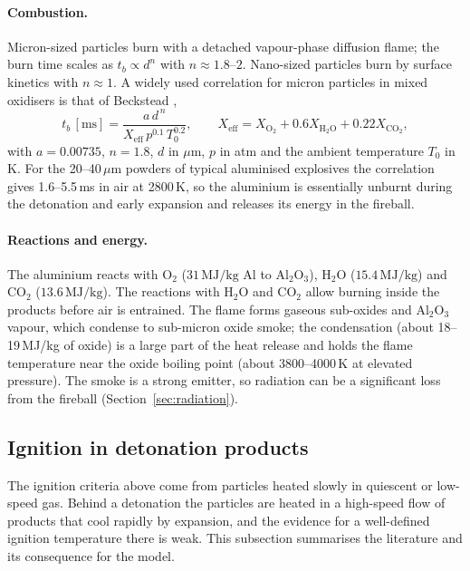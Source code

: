 \documentclass{article}
\begin{document}
\paragraph{Combustion.} Micron-sized particles burn with a detached vapour-phase diffusion flame; the burn time scales as $t_b \propto d^n$ with $n \approx 1.8$--$2$. Nano-sized particles burn by surface kinetics with $n \approx 1$. A widely used correlation for micron particles in mixed oxidisers is that of Beckstead \cite{beckstead},
\begin{equation}
    t_b\,[\text{ms}] = \frac{a\,d^{\,n}}{X_\text{eff}\,p^{0.1}\,T_0^{0.2}}, \qquad X_\text{eff} = X_{\text{O}_2} + 0.6X_{\text{H}_2\text{O}} + 0.22X_{\text{CO}_2},
    \label{eq:beckstead}
\end{equation}
with $a = 0.00735$, $n = 1.8$, $d$ in $\mu$m, $p$ in atm and the ambient temperature $T_0$ in K.
For the 20--40\,$\mu$m powders of typical aluminised explosives the correlation gives 1.6--5.5\,ms in air at 2800\,K, so the aluminium is essentially unburnt during the detonation and early expansion and releases its energy in the fireball.

\paragraph{Reactions and energy.} The aluminium reacts with O$_2$ ($31\,\text{MJ/kg}$ Al to Al$_2$O$_3$), H$_2$O ($15.4\,\text{MJ/kg}$) and CO$_2$ ($13.6\,\text{MJ/kg}$). The reactions with H$_2$O and CO$_2$ allow burning inside the products before air is entrained. The flame forms gaseous sub-oxides and Al$_2$O$_3$ vapour, which condense to sub-micron oxide smoke; the condensation (about 18--19\,MJ/kg of oxide) is a large part of the heat release and holds the flame temperature near the oxide boiling point (about 3800--4000\,K at elevated pressure). The smoke is a strong emitter, so radiation can be a significant loss from the fireball (Section~\ref{sec:radiation}).

\subsection{Ignition in detonation products}
\label{sec:al_ignition}

The ignition criteria above come from particles heated slowly in quiescent or low-speed gas. Behind a detonation the particles are heated in a high-speed flow of products that cool rapidly by expansion, and the evidence for a well-defined ignition temperature there is weak. This subsection summarises the literature and its consequence for the model.
\end{document}
